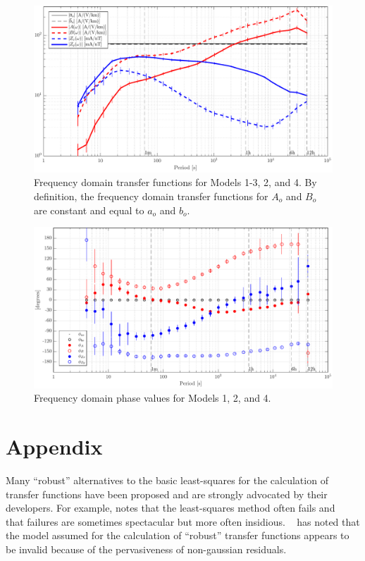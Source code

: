\documentclass[draft,linenumbers]{agujournal2018}
\begin{document}
\begin{figure}[h]
\centering
\includegraphics[width=\textwidth]{figures/plot_model_summary_Z-options-1.pdf}
\caption{Frequency domain transfer functions for Models 1-3, 2, and 4. By definition, the frequency domain transfer functions for $A_o$ and $B_o$ are constant and equal to $a_o$ and $b_o$.}
\label{Z}
\end{figure}

\begin{figure}[h]
\centering
\includegraphics[width=\textwidth]{figures/plot_model_summary_Phi-options-1.pdf}
\caption{Frequency domain phase values for Models 1, 2, and 4.}
\label{Phi}
\end{figure}

\clearpage

\appendix
\section{Appendix}

Many ``robust'' alternatives to the basic least-squares for the calculation of transfer functions have been proposed and are strongly advocated by their developers. For example, \citep{Egbert2011} notes that the least-squares method often fails and ~\citep{Chave1987} that failures are sometimes spectacular but more often insidious. ~\cite{Chave2017} has noted that the model assumed for the calculation of ``robust'' transfer functions appears to be invalid because of the pervasiveness of non-gaussian residuals.
\end{document}
